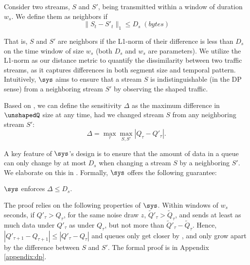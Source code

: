 \begin{definition}
\label{def:neighboring-streams}
Consider two streams, $S$ and $S'$, being transmitted within a window of duration $w_s$. We define them as neighbors if
\begin{equation}\label{equ:stream-neighboring}
  \|S_t - S'_t\|_1 \leq D_s \; (bytes)
\end{equation}

\end{definition}

That is, $S$ and $S'$ are neighbors if the L1-norm of their difference is less than $D_s$ on the time window of size $w_s$ (both $D_s$ and $w_s$ are parameters).
%
We utilize the L1-norm as our distance metric to quantify the dissimilarity
between two traffic streams, as it captures differences in both segment size and
temporal pattern.
%
Intuitively, {$\sys$} aims to ensure that a stream $S$ is indistinguishable (in the DP
sense) from a neighboring stream $S'$ by observing the shaped traffic.

Based on , we can define the sensitivity $\Delta$ as the maximum
difference in {$\unshapedQ$} size at any time, had we changed stream $S$ from
any neighboring stream $S'$:
\begin{equation}
  \Delta = \max_{\tau}\max_{S, S'} | Q_{\tau} - Q'_{\tau} | .
\end{equation}

A key feature of $\sys$'s design is to ensure that the amount of data in a queue
can only change by at most $D_s$ when changing a stream $S$ by a neighboring
$S'$. We elaborate on this in .
Formally, {$\sys$} offers the following guarantee:
\begin{proposition}\label{prop:sensitivity}
  {$\sys$} enforces $\Delta \leq D_s$.
\end{proposition}
\begin{proofsketch}
  The proof relies on the following properties of {$\sys$}.
  Within windows of $w_s$ seconds, if $Q'_{\tau} > Q_{\tau}$, for the same noise draw $z$, $\tilde{Q}'_{\tau} > \tilde{Q}_{\tau}$, and  sends at least as much data under $Q'_{\tau}$ as under $Q_{\tau}$, but not more than $\tilde{Q}'_{\tau} - \tilde{Q}_{\tau}$.
  Hence, $|Q'_{\tau+1} - Q_{\tau+1}| \leq |Q'_{\tau} - Q_{\tau}|$ and queues only get closer by , and only grow apart by the difference between $S$ and $S'$.
  The formal proof is in Appendix \ref{appendix:dp}.
\end{proofsketch}

